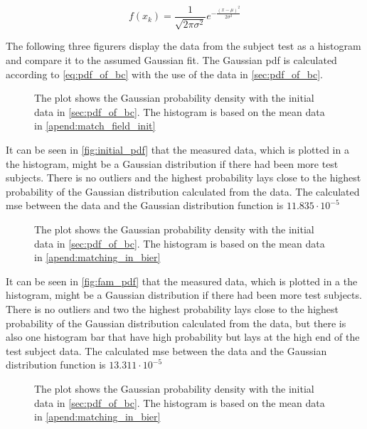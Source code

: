 \begin{equation}\label{eq:pdf_of_bc}
f(x_{k}) = \frac{1}{\sqrt{2 \pi \sigma^2}}e^{-\frac{(x-\mu)^2}{2\sigma^2}}
\end{equation}


The following three figurers display the data from the subject test as a histogram and compare it to the assumed Gaussian fit. The Gaussian \gls{pdf} is calculated according to \autoref{eq:pdf_of_bc} with the use of the data in \autoref{sec:pdf_of_bc}.



 \begin{figure}[H]
	\centering
	
		\caption{The plot shows the Gaussian probability density with the initial data in \autoref{sec:pdf_of_bc}. The histogram is based on the mean data in \autoref{apend:match_field_init}}
		\label{fig:initial_pdf}
\end{figure}

It can be seen in \autoref{fig:initial_pdf} that the measured data, which is plotted in a the histogram, might be a Gaussian distribution if there had been more test subjects. There is no outliers and the highest probability lays close to the highest probability of the Gaussian distribution calculated from the data. The calculated \gls{mse} between the data and the Gaussian distribution function is $11.835 \cdot 10^{-5}$


 \begin{figure}[H]
	\centering
	
		\caption{The plot shows the Gaussian probability density with the initial data in \autoref{sec:pdf_of_bc}. The histogram is based on the mean data in \autoref{apend:matching_in_bier}}
		\label{fig:fam_pdf}
\end{figure}

It can be seen in \autoref{fig:fam_pdf} that the measured data, which is plotted in a the histogram, might be a Gaussian distribution if there had been more test subjects. There is no outliers and two the highest probability lays close to the highest probability of the Gaussian distribution calculated from the data, but there is also one histogram bar that have high probability but lays at the high end of the test subject data. The calculated \gls{mse} between the data and the Gaussian distribution function is $13.311 \cdot 10^{-5}$


 \begin{figure}[H]
	\centering
	
		\caption{The plot shows the Gaussian probability density with the initial data in \autoref{sec:pdf_of_bc}. The histogram is based on the mean data in \autoref{apend:matching_in_bier}}
		\label{fig:bier_pdf}
\end{figure}

